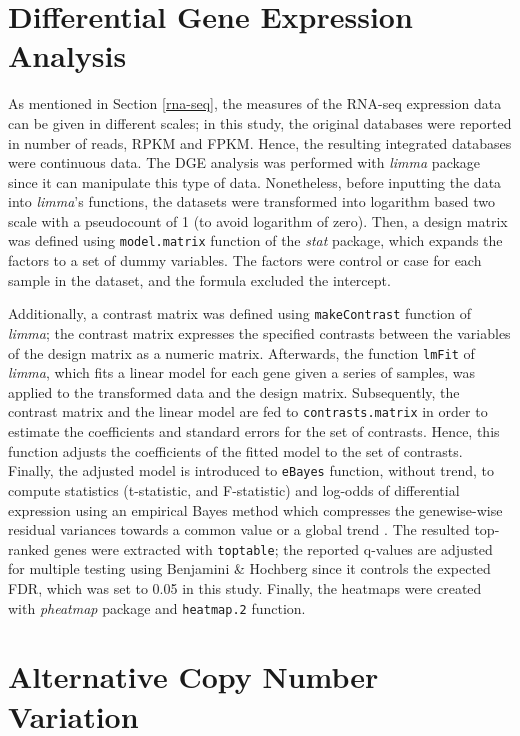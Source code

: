 \section{Differential Gene Expression Analysis} \label{dgea}

As mentioned in Section \ref{rna-seq}, the measures of the RNA-seq expression data can be given in different scales; in this study, the original databases were reported in number of reads, RPKM and FPKM. Hence, the resulting integrated databases were continuous data. The DGE analysis was performed with \textit{limma} package since it can manipulate this type of data. Nonetheless, before inputting the data into \textit{limma}'s functions, the datasets were transformed into logarithm based two scale with a pseudocount of 1 (to avoid logarithm of zero). Then, a design matrix was defined using \verb|model.matrix| function of the \textit{stat} package, which expands the factors to a set of dummy variables. The factors were control or case for each sample in the dataset, and the formula excluded the intercept.

Additionally, a contrast matrix was defined using \verb|makeContrast| function of \textit{limma}; the contrast matrix expresses the specified contrasts between the variables of the design matrix as a numeric matrix. Afterwards, the function \verb|lmFit| of \textit{limma}, which fits a linear model for each gene given a series of samples, was applied to the transformed data and the design matrix. Subsequently, the contrast matrix and the linear model are fed to \verb|contrasts.matrix| in order to estimate the coefficients and standard errors for the set of contrasts. Hence, this function adjusts the coefficients of the fitted model to the set of contrasts. Finally, the adjusted model is introduced to \verb|eBayes| function, without trend, to compute statistics (t-statistic, and F-statistic) and log-odds of differential expression using an empirical Bayes method which compresses the genewise-wise residual variances towards a common value or a global trend \cite{ebayes}. The resulted top-ranked genes were extracted with \verb|toptable|; the reported q-values are adjusted for multiple testing using Benjamini \& Hochberg since it controls the expected FDR, which was set to 0.05 in this study. Finally, the heatmaps were created with \textit{pheatmap} \cite{pheatmap} package and \verb|heatmap.2| function.

\section{Alternative Copy Number Variation} \label{cnv-method}


